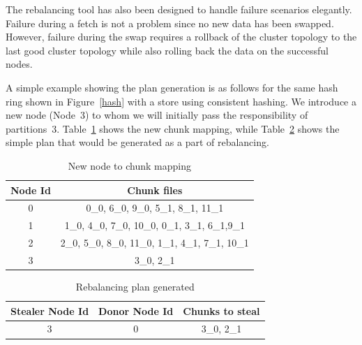 The rebalancing tool has also been designed to handle failure
scenarios elegantly. Failure during a fetch is not a problem since no
new data has been swapped. However, failure during the swap requires a
rollback of the cluster topology to the last good cluster topology
while also rolling back the data on the successful nodes. 

A simple example showing the plan generation is as follows for the
same hash ring shown in Figure~\ref{hash} with a store using
consistent hashing. We introduce a new node (Node~3) to whom we will
initially pass the responsibility of partitions~3.
Table~\ref{tab:new_node_to_chunk} shows the new chunk mapping, while
Table~\ref{tab:rebalance_plan} shows the simple plan that would be
generated as a part of rebalancing. 

\begin{table}
\begin{center}
    \begin{tabular}{ | c | c | }
    \hline
    Node Id & Chunk files \\ \hline
    0 &  	0\_0, 6\_0, 9\_0,      			5\_1, 8\_1, 11\_1 			\\
   	1 &   	1\_0, 4\_0, 7\_0, 10\_0,      	0\_1, 3\_1, 6\_1,9\_1  		\\
   	2 &    	2\_0, 5\_0, 8\_0, 11\_0,    	1\_1, 4\_1, 7\_1, 10\_1		\\
   	3 &   	3\_0,                         	2\_1 						\\
\hline
    \end{tabular}
\end{center}
 	\caption{New node to chunk mapping}
 	\label{tab:new_node_to_chunk}
\end{table}

\begin{table}
\begin{center}
    \begin{tabular}{ | c | c | c | }
    \hline
    Stealer Node Id & Donor Node Id & Chunks to steal \\ \hline
    3 &  0 & 3\_0, 2\_1	\\
\hline
    \end{tabular}
\end{center}
\caption{Rebalancing plan generated}
\label{tab:rebalance_plan}
\end{table}

